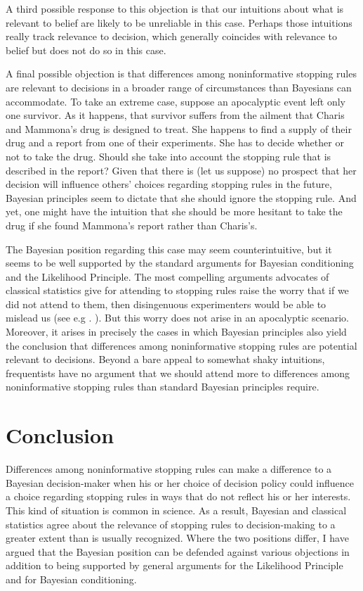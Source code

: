 \documentclass{article}
\theoremstyle{definition}
\begin{document}
A third possible response to this objection is that our intuitions about what is relevant to belief are likely to be unreliable in this case.
Perhaps those intuitions really track relevance to decision, which generally coincides with relevance to belief but does not do so in this case.

A final possible objection is that differences among noninformative stopping rules are relevant to decisions in a broader range of circumstances than Bayesians can accommodate.
To take an extreme case,  suppose an apocalyptic event left only one survivor.
As it happens, that survivor suffers from the ailment that Charis and Mammona's drug is designed to treat.
She happens to find a supply of their drug and a report from one of their experiments.
She has to decide whether or not to take the drug.
Should she take into account the stopping rule that is described in the report?
Given that there is (let us suppose) no prospect that her decision will influence others' choices regarding stopping rules in the future, Bayesian principles seem to dictate that she should ignore the stopping rule.
And yet, one might have the intuition that she should be more hesitant to take the drug if she found Mammona's report rather than Charis's.

The Bayesian position regarding this case may seem counterintuitive, but it seems to be well supported by the standard arguments for Bayesian conditioning and the Likelihood Principle.
The most compelling arguments advocates of classical statistics give for attending to stopping rules raise the worry that if we did not attend to them, then disingenuous experimenters would be able to mislead us (see e.g
. \citealp{mayo+kruse01}).
But this worry does not arise in an apocalyptic scenario.
Moreover, it arises in precisely the cases in which Bayesian principles also yield the conclusion that differences among noninformative stopping rules are potential relevant to decisions.
Beyond a bare appeal to somewhat shaky intuitions, frequentists have no argument that we should attend more to differences among noninformative stopping rules than standard Bayesian principles require.

\section{Conclusion}

Differences among noninformative stopping rules can make a difference to a Bayesian decision-maker when his or her choice of decision policy could influence a choice regarding stopping rules in ways that do not reflect his or her interests.
This kind of situation is common in science.
As a result, Bayesian and classical statistics agree about the relevance of stopping rules to decision-making to a greater extent than is usually recognized.
Where the two positions differ, I have argued that the Bayesian position can be defended against various objections in addition to being supported by general arguments for the Likelihood Principle and for Bayesian conditioning.
\end{document}

